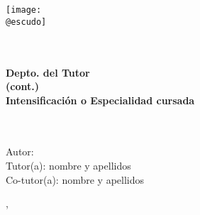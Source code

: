 \begin{titlepage}
    \makeatletter
	\begin{center}
        \vspace{1cm}
		\texttt{[image: \\@escudo]}\vspace{1cm}
		
		{\LARGE \textbf{\@instEdu \\[0.5ex]
				\@centroEdu}}\\[0.5cm]
		{\Large \textbf{Depto. del Tutor}}\\ \smallskip%
        {\Large\textbf{(cont.)}}\\[0.5cm]
		{\large \textbf{Intensificación o Especialidad cursada}}\\[1.5cm]
		{\LARGE \textbf{\@tipoDoc}}\\[1cm]
		
		
		{\LARGE \textbf{\@tituloPrimera}}\\ \smallskip%
		\ifdefined\@tituloSegunda{\LARGE \textbf{\@tituloSegunda}}
		\else \phantom{\LARGE Texto fantasma}
		\fi
	\end{center}
	\vfill%
	\begin{flushleft}
		{\Large Autor: \@autor} \\ \bigskip%
		{\Large Tutor(a): nombre y apellidos} \\ \bigskip%
		{\Large Co-tutor(a): nombre y apellidos}
	\end{flushleft}
	\vspace{2cm}%
	\begin{flushright}
		{\Large \ifspanish \@mesTF \else \@monthTF \fi, \@yearTF}
	\end{flushright}
	\cleardoublepage
    \makeatother
\end{titlepage}
	









